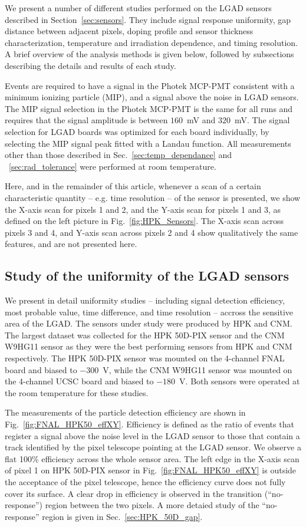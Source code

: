 \documentclass[preprint,1p]{elsarticle}
\begin{document}
We present a number of different studies performed on the LGAD sensors 
described in Section~\ref{sec:sensors}. They include signal response 
uniformity, gap distance between adjacent pixels, 
doping profile and sensor thickness characterization,
temperature and irradiation dependence, and timing resolution. A brief overview of the
analysis methods is given below, followed by subsections describing
the details and results of each study.

Events are required to have a signal in the Photek MCP-PMT consistent with a 
minimum ionizing particle (MIP), and a signal above the noise in LGAD sensors. 
The MIP signal selection in the Photek MCP-PMT is the same for all runs
and requires that the signal amplitude is between $160$~mV and $320$~mV.
The signal selection for LGAD boards was
optimized for each board individually, by selecting the MIP signal peak fitted
with a Landau function. All measurements other than those described in Sec.~\ref{sec:temp_dependance}
and ~\ref{sec:rad_tolerance} were performed at room temperature. 

Here, and in the remainder of this article, whenever a scan of a certain
characteristic quantity -- e.g. time resolution --  of the sensor is presented, we show the
X-axis scan for pixels 1 and 2, and the Y-axis scan for pixels 1 and 3, as
defined on the left picture in Fig.~\ref{fig:HPK_Sensors}. The X-axis scan
across pixels 3 and 4, and Y-axis scan across pixels 2 and 4 show
qualitatively the same features, and are not presented here. 


\subsection{Study of the uniformity of the LGAD sensors}
\label{sec:HPK_CNM_uniformity}

We present in detail uniformity studies -- including signal detection
efficiency, most probable value, time difference, and time resolution  -- accross the sensitive
area of the LGAD. The sensors under study were produced
by HPK and CNM. The largest dataset was collected for the 
HPK 50D-PIX sensor and the CNM W9HG11 sensor as they were the best
performing sensors from HPK and CNM respectively. The 
HPK 50D-PIX sensor was mounted on the 4-channel FNAL board and biased to $-300$~V, while the 
CNM W9HG11 sensor was mounted on the 4-channel UCSC board and biased to $-180$~V.
Both sensors were operated at the room temperature for these studies. 

The measurements of the particle detection efficiency are shown in
Fig.~\ref{fig:FNAL_HPK50_effXY}. Efficiency is defined as the ratio of events
that register a signal above the noise level in the LGAD sensor to those that
contain a track identified by the pixel telescope pointing at the LGAD sensor.
We observe a flat 100\% efficiency across the whole sensor area. The left edge
in the X-axis scan of pixel 1 on HPK 50D-PIX sensor in
Fig.~\ref{fig:FNAL_HPK50_effXY} is outside the acceptance of the pixel
telescope, hence the efficiency curve does not fully cover its surface. A clear
drop in efficiency is observed in the transition (``no-response'') region between the two pixels.
A more detaied study of the ``no-response'' region is given in Sec.~\ref{sec:HPK_50D_gap}.
\end{document}

